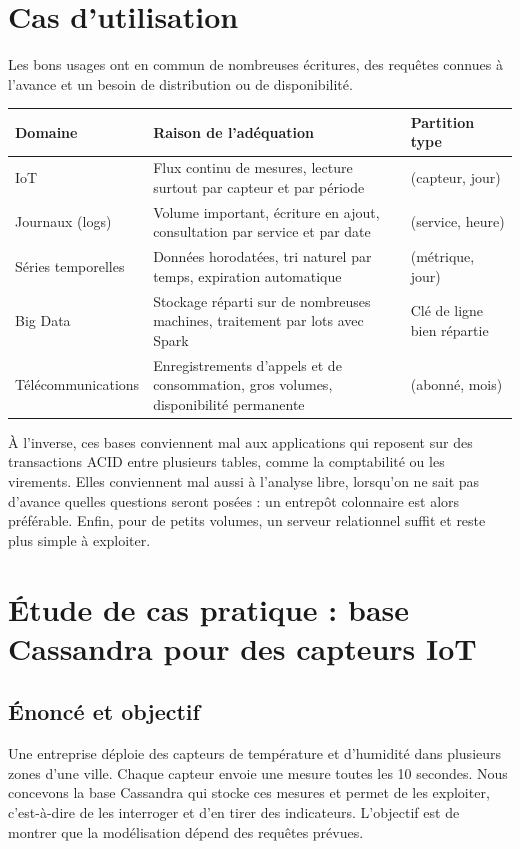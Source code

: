 \documentclass[11pt,a4paper]{article}
\begin{document}
\section{Cas d'utilisation}

Les bons usages ont en commun de nombreuses écritures, des requêtes connues à l'avance et un besoin de distribution ou de disponibilité.

\begin{center}
\small
\begin{tabularx}{\textwidth}{@{}>{\raggedright\arraybackslash}p{3.2cm}>{\raggedright\arraybackslash}X>{\raggedright\arraybackslash}X@{}}
\toprule
Domaine & Raison de l'adéquation & Partition type \\
\midrule
IoT & Flux continu de mesures, lecture surtout par capteur et par période & (capteur, jour) \\
Journaux (logs) & Volume important, écriture en ajout, consultation par service et par date & (service, heure) \\
Séries temporelles & Données horodatées, tri naturel par temps, expiration automatique & (métrique, jour) \\
Big Data & Stockage réparti sur de nombreuses machines, traitement par lots avec Spark & Clé de ligne bien répartie \\
Télécommunications & Enregistrements d'appels et de consommation, gros volumes, disponibilité permanente & (abonné, mois) \\
\bottomrule
\end{tabularx}
\end{center}

À l'inverse, ces bases conviennent mal aux applications qui reposent sur des transactions ACID entre plusieurs tables, comme la comptabilité ou les virements. Elles conviennent mal aussi à l'analyse libre, lorsqu'on ne sait pas d'avance quelles questions seront posées : un entrepôt colonnaire est alors préférable. Enfin, pour de petits volumes, un serveur relationnel suffit et reste plus simple à exploiter.

\section{Étude de cas pratique : base Cassandra pour des capteurs IoT}
\label{sec:cas}

\subsection{Énoncé et objectif}
Une entreprise déploie des capteurs de température et d'humidité dans plusieurs zones d'une ville. Chaque capteur envoie une mesure toutes les 10 secondes. Nous concevons la base Cassandra qui stocke ces mesures et permet de les exploiter, c'est-à-dire de les interroger et d'en tirer des indicateurs. L'objectif est de montrer que la modélisation dépend des requêtes prévues.
\end{document}
